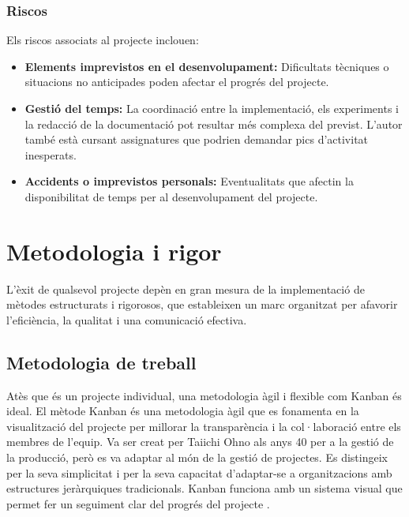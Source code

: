 \documentclass[a4paper,12pt]{report}
\begin{document}
\subsubsection{Riscos}

Els riscos associats al projecte inclouen: 

\begin{itemize}
    \item \textbf{Elements imprevistos en el desenvolupament:} Dificultats tècniques o situacions no anticipades poden afectar el progrés del projecte.
    \item  \textbf{Gestió del temps:} La coordinació entre la implementació, els experiments i la redacció de la documentació pot resultar més complexa del previst. L'autor també està cursant assignatures que podrien demandar pics d'activitat inesperats.
    \item \textbf{Accidents o imprevistos personals:} Eventualitats que afectin la disponibilitat de temps per al desenvolupament del projecte.
\end{itemize}

\section{Metodologia i rigor}

L'èxit de qualsevol projecte depèn en gran mesura de la implementació de mètodes estructurats i rigorosos, que estableixen un marc organitzat per afavorir l'eficiència, la qualitat i una comunicació efectiva.

\subsection{Metodologia de treball}

Atès que és un projecte individual, una metodologia àgil i flexible com Kanban és ideal. El mètode Kanban és una metodologia àgil que es fonamenta en la visualització del projecte per millorar la transparència i la col·laboració entre els membres de l'equip.
Va ser creat per Taiichi Ohno als anys 40 per a la gestió de la producció, però es va adaptar al món de la gestió de projectes.
Es distingeix per la seva simplicitat i per la seva capacitat d’adaptar-se a organitzacions amb estructures jeràrquiques tradicionals.
Kanban funciona amb un sistema visual que permet fer un seguiment clar del progrés del projecte \cite{Person_2025}.
\end{document}
